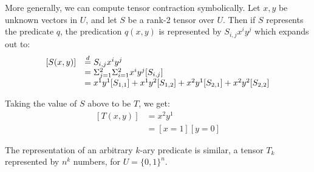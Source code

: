 More generally, we can compute tensor contraction symbolically. Let \(x,y\) be  unknown vectors in \(U\), and let \(S\) be a rank-2 tensor over \(U\). Then if \(S\) represents the predicate \(q\), the predication \(q(x,y)\) is represented by \(S_{i,j}x^i y^j\) which expands out to:
\[\begin{array}{ll}
  [S(x,y)]&\defeq  S_{i,j}x^i y^j\\
  & = \Sigma_{j=1}^2 \Sigma_{i=1}^2 x^i y^j [S_{i,j}] \\
  & =   x^1 y^1  [S_{1,1}] + x^1 y^2 [S_{1,2}]
      + x^2 y^1 [S_{2,1}]  + x^2 y^2 [S_{2,2}]
  \end{array}
\]

\begin{example}
  Taking the value of \(S\) above to be \(T\), we get:
  \[\begin{array}{ll}    
      [T(x,y)] & = x^2y^1\\
      & = [x=1][y=0]
  \end{array}
  \]
\end{example}

The representation of an arbitrary $k$-ary predicate is similar, a tensor \(T_k\) represented by \(n^k\) numbers, for \(U=\{0,1\}^n\). 
